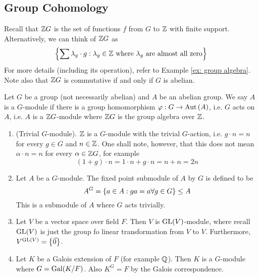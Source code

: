 \newpage
\subsection{Group Cohomology}
Recall that ${\mathbb Z} G$ is the set of functions $f$ from $G$ to ${\mathbb Z}$ with finite support. Alternatively, we can think of ${\mathbb Z} G$ as 
\[\left\{\sum \lambda_g \cdot g:\lambda_g \in {\mathbb Z}\text{ where $\lambda_g$ are almost all zero}\right\}\]
For more details (including its operation), refer to Example \ref{ex: group algebra}. Note also that ${\mathbb Z} G$ is commutative if and only if $G$ is abelian.

\medskip

\begin{defn} [$G$-module]
    Let $G$ be a group (not necessarily abelian) and $A$ be an abelian group. We say $A$ is a $G$-module if there is a group homomorphism $\varphi:G\to \operatorname{Aut}\left(A\right)$, i.e. $G$ acts on $A$, i.e. $A$ is a ${\mathbb Z} G$-module where ${\mathbb Z} G$ is the group algebra over ${\mathbb Z}$.
\end{defn}

\medskip

\begin{ex}
    \hfill

    \begin{enumerate}
        \item (Trivial $G$-module). ${\mathbb Z}$ is a $G$-module with the trivial $G$-action, i.e. $g\cdot n = n$ for every $g\in G$ and $n\in {\mathbb Z}$. One shall note, however, that this does not mean $\alpha\cdot n = n$ for every $\alpha \in {\mathbb Z} G$, for example
        \[(1+g)\cdot n = 1\cdot n + g\cdot n = n+n = 2n\]
        \item Let $A$ be a $G$-module. The fixed point submodule of $A$ by $G$ is defined to be
        \[A^G = \left\{a\in A : ga = a \forall g\in G\right\}\leq A\]
        This is a submodule of $A$ where $G$ acts trivially.
        \item Let $V$ be a vector space over field $F$. Then $V$ is $\operatorname{GL}(V)$-module, where recall $\operatorname{GL}(V)$ is just the group fo linear transformation from $V$ to $V$. Furthermore, $V^{\operatorname{GL}(V)}= \left\{\vec 0\right\}$.
        \item Let $K$ be a Galois extension of $F$ (for example ${\mathbb Q}$). Then $K$ is a $G$-module where $G = \operatorname{Gal}(K/F)$. Also $K^G = F$ by the Galois correspondence.
    \end{enumerate}
\end{ex}

\medskip

